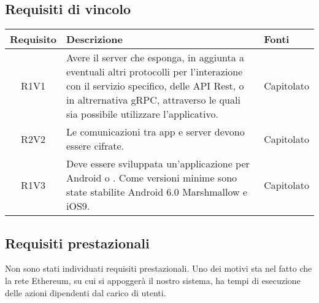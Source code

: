 \begin{center}
\begin{longtable}{|c|p{10cm}|p{4cm}|}
		
	\end{longtable}
\end{center}
\subsection{Requisiti di vincolo}
\begin{center}
	\begin{longtable}{|c|p{10cm}|p{4cm}|}
		\hline
		\rowcolor{lighter-grayer}
		\textbf{Requisito} & \textbf{Descrizione} & \textbf{Fonti}  \\
		\hline
		\endhead
		
		
		R1V1 &Avere il server che esponga, in aggiunta a eventuali altri protocolli per l’interazione con il servizio specifico, delle API Rest, o in altrernativa gRPC, attraverso le quali sia possibile utilizzare l’applicativo. & Capitolato \\
		\hline
		
		R2V2&Le comunicazioni tra app e server devono essere cifrate.	& Capitolato	\\
		
		\hline
		R1V3&Deve essere sviluppata un'applicazione per Android o \glock{iOS}. Come versioni minime sono state stabilite Android 6.0 Marshmallow e iOS9.	& Capitolato	\\
		\hline
		
		
	\end{longtable}
\end{center}

\subsection{Requisiti prestazionali}
Non sono stati individuati requisiti prestazionali. Uno dei motivi sta nel fatto che la rete Ethereum, su cui si appoggerà il nostro sistema, ha tempi di esecuzione delle azioni dipendenti dal carico di utenti.
%		
%		

